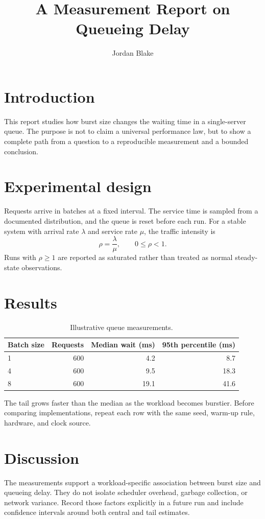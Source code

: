 \documentclass[lang=en]{sjtureport}
\title{A Measurement Report on Queueing Delay}
\author{Jordan Blake}
\begin{document}
\maketitle

\chapter{Introduction}
This report studies how burst size changes the waiting time in a single-server
queue. The purpose is not to claim a universal performance law, but to show a
complete path from a question to a reproducible measurement and a bounded
conclusion.

\chapter{Experimental design}
Requests arrive in batches at a fixed interval. The service time is sampled
from a documented distribution, and the queue is reset before each run. For a
stable system with arrival rate $\lambda$ and service rate $\mu$, the traffic
intensity is
\begin{equation}
  \rho=\frac{\lambda}{\mu},\qquad 0\leq\rho<1.
\end{equation}
Runs with $\rho\geq1$ are reported as saturated rather than treated as normal
steady-state observations.

\chapter{Results}
\begin{table}[ht]
\centering
\caption{Illustrative queue measurements.}
\begin{tabular}{@{}lrrr@{}}
\toprule
Batch size & Requests & Median wait (ms) & 95th percentile (ms)\\
\midrule
1 & 600 & 4.2 & 8.7\\
4 & 600 & 9.5 & 18.3\\
8 & 600 & 19.1 & 41.6\\
\bottomrule
\end{tabular}
\end{table}

The tail grows faster than the median as the workload becomes burstier. Before
comparing implementations, repeat each row with the same seed, warm-up rule,
hardware, and clock source.

\chapter{Discussion}
The measurements support a workload-specific association between burst size
and queueing delay. They do not isolate scheduler overhead, garbage
collection, or network variance. Record those factors explicitly in a future
run and include confidence intervals around both central and tail estimates.
\end{document}
